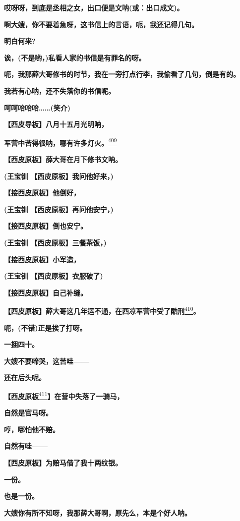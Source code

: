 \textbf{哎呀呀，到底是丞相之女，出口便是文呐(或：出口成文)。}

\textbf{啊大嫂，你不要着急呀，这书信上的言语，呃，我还记得几句。}

\textbf{明白何来?}

\textbf{诶，(不是哟，)私看人家的书信是有罪名的呀。}

\textbf{呃，我那薛大哥修书的时节，我在一旁打点行李，我偷看了几句，倒是有的。}

\textbf{我若有心呐，还不失落你的书信呢。}

\textbf{呵呵哈哈哈\ldots{}\ldots{}(笑介)}

\textbf{【西皮导板】八月十五月光明呐，}

\textbf{军营中苦得很呐，哪有许多灯火。}\protect\hyperlink{fn409}{\textsuperscript{409}}

\textbf{【西皮原板】薛大哥在月下修书文呐。}

\textbf{(王宝钏 【西皮原板】我问他好来，)}

\textbf{【接西皮原板】他倒好，}

\textbf{(王宝钏 【西皮原板】再问他安宁，)}

\textbf{【接西皮原板】倒也安宁。}

\textbf{(王宝钏 【西皮原板】三餐茶饭，)}

\textbf{【接西皮原板】小军造，}

\textbf{(王宝钏 【西皮原板】衣服破了)}

\textbf{【接西皮原板】自己补缝。}

\textbf{【西皮原板】薛大哥这几年运不通，在西凉军营中受了酷刑}\protect\hyperlink{fn410}{\textsuperscript{410}}\textbf{。}

\textbf{呃，(不错)正是挨了打呀。}

\textbf{一捆四十。}

\textbf{大嫂不要啼哭，这苦哇------}

\textbf{还在后头呢。}

\textbf{【西皮原板}\protect\hyperlink{fn411}{\textsuperscript{411}}\textbf{】在营中失落了一骑马，}

\textbf{自然是官马呀。}

\textbf{哼，哪怕他不赔。}

\textbf{自然有哇------}

\textbf{【西皮原板】为赔马借了我十两纹银。}

\textbf{一份。}

\textbf{也是一份。}

\textbf{大嫂你有所不知呀，我那薛大哥啊，原先么，本是个好人呐。}

